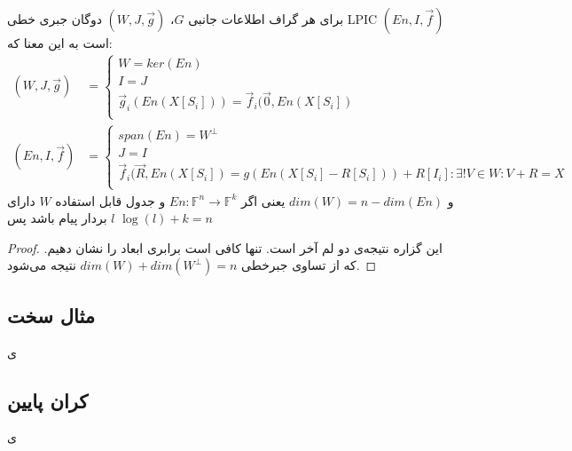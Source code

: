 \begin{theorem}
    \label{thm1}
    برای هر گراف اطلاعات جانبی 
    $G$، 
    \lpsicod
     $(W, J, \overrightarrow{g})$
     دوگان جبری خطی
      LPIC $(En, I, \overrightarrow{f})$ 
      است به این معنا که:
    \begin{align*}
    (W, J, \overrightarrow{g}) &= \begin{cases}
                                      W = ker(En)\\
                                      I = J \\
                                      \overrightarrow{g}_i(En(X[S_i])) = \overrightarrow{f}_i(\overrightarrow{0}, En(X[S_i])\\
    \end{cases} \\
    (En, I, \overrightarrow{f}) &= \begin{cases}
                                       span(En) = W^{\bot} \\
                                       J = I \\
                                       \overrightarrow{f}_i(\overrightarrow{R}, En(X[S_i]) = g(En(X[S_i] - R[S_i])) + R[I_i]: \exists! V \in W: V + R = X \\
    \end{cases}
    \end{align*}
    و 
    $dim(W) = n - dim(En)$
     یعنی اگر
     $En: \mathbb{F}^n \rightarrow \mathbb{F}^k$
      و جدول قابل استفاده
      $W$
       دارای 
       $l$
       بردار پیام باشد پس 
       $\log(l) + k = n$
\end{theorem}
\begin{proof}
    این گزاره نتیجه‌ی دو لم آخر است. تنها کافی است برابری ابعاد را نشان دهیم. که از تساوی جبرخطی 
    $dim(W) + dim(W^{\bot}) = n$ 
    نتیجه می‌شود.
\end{proof}
\subsection{
	مثال سخت
}
ی
\subsection{
	کران پایین
}
ی